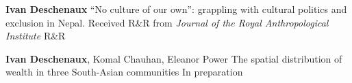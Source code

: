 


\begin{cvpublications}

  \cvpublication
  {\textbf{Ivan Deschenaux}}
  {``No culture of our own'': grappling with cultural politics and exclusion in Nepal. Received R\&R from \textit{Journal of the Royal Anthropological Institute}} %
  {R\&R} %

  \cvpublication
  {\textbf{Ivan Deschenaux}, Komal Chauhan, Eleanor Power}
  {The spatial distribution of wealth in three South-Asian communities} %
  {In preparation} %





\end{cvpublications}


